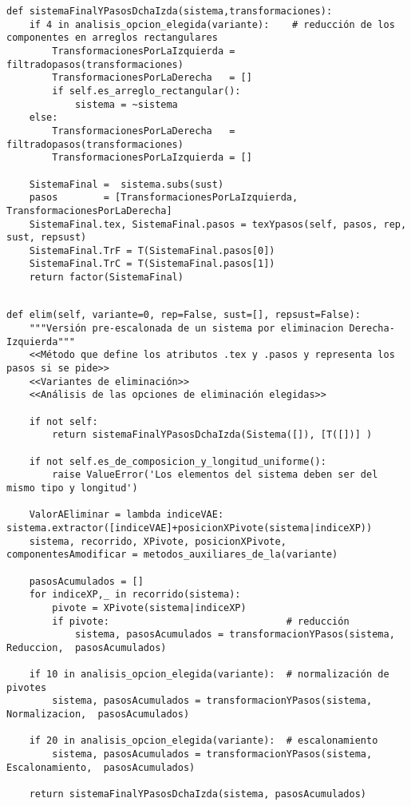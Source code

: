 \documentclass[11pt]{report}
\begin{document}
\begin{verbatim}
def sistemaFinalYPasosDchaIzda(sistema,transformaciones):
    if 4 in analisis_opcion_elegida(variante):    # reducción de los componentes en arreglos rectangulares
        TransformacionesPorLaIzquierda = filtradopasos(transformaciones)
        TransformacionesPorLaDerecha   = []
        if self.es_arreglo_rectangular():
            sistema = ~sistema
    else: 
        TransformacionesPorLaDerecha   = filtradopasos(transformaciones)
        TransformacionesPorLaIzquierda = []

    SistemaFinal =  sistema.subs(sust)
    pasos        = [TransformacionesPorLaIzquierda, TransformacionesPorLaDerecha]
    SistemaFinal.tex, SistemaFinal.pasos = texYpasos(self, pasos, rep, sust, repsust)
    SistemaFinal.TrF = T(SistemaFinal.pasos[0])
    SistemaFinal.TrC = T(SistemaFinal.pasos[1])
    return factor(SistemaFinal)

\end{verbatim}



\begin{verbatim}

def elim(self, variante=0, rep=False, sust=[], repsust=False):
    """Versión pre-escalonada de un sistema por eliminacion Derecha-Izquierda"""
    <<Método que define los atributos .tex y .pasos y representa los pasos si se pide>>
    <<Variantes de eliminación>>
    <<Análisis de las opciones de eliminación elegidas>>
    
    if not self:
        return sistemaFinalYPasosDchaIzda(Sistema([]), [T([])] )
    
    if not self.es_de_composicion_y_longitud_uniforme():
        raise ValueError('Los elementos del sistema deben ser del mismo tipo y longitud')
    
    ValorAEliminar = lambda indiceVAE: sistema.extractor([indiceVAE]+posicionXPivote(sistema|indiceXP))
    sistema, recorrido, XPivote, posicionXPivote, componentesAmodificar = metodos_auxiliares_de_la(variante)
    
    pasosAcumulados = []
    for indiceXP,_ in recorrido(sistema):
        pivote = XPivote(sistema|indiceXP)        
        if pivote:                               # reducción
            sistema, pasosAcumulados = transformacionYPasos(sistema,  Reduccion,  pasosAcumulados)
            
    if 10 in analisis_opcion_elegida(variante):  # normalización de pivotes
        sistema, pasosAcumulados = transformacionYPasos(sistema,  Normalizacion,  pasosAcumulados)

    if 20 in analisis_opcion_elegida(variante):  # escalonamiento
        sistema, pasosAcumulados = transformacionYPasos(sistema, Escalonamiento,  pasosAcumulados)

    return sistemaFinalYPasosDchaIzda(sistema, pasosAcumulados)
        
\end{verbatim}
\end{document}
